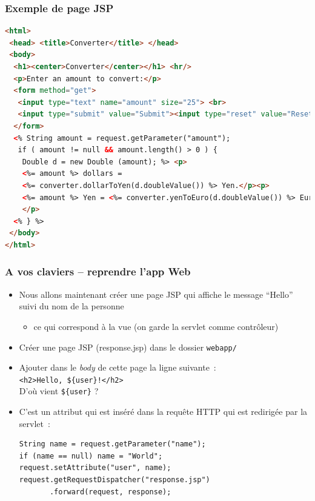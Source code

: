 \documentclass{beamer}
\begin{document}
\begin{frame}[fragile]
	\frametitle{Exemple de page JSP}
	\begin{flushleft}
\begin{lstlisting}[language=HTML,basicstyle=\tiny]
<html>
 <head> <title>Converter</title> </head>
 <body>
  <h1><center>Converter</center></h1> <hr/>
  <p>Enter an amount to convert:</p>
  <form method="get">
   <input type="text" name="amount" size="25"> <br>
   <input type="submit" value="Submit"><input type="reset" value="Reset">
  </form>
  <% String amount = request.getParameter("amount");
   if ( amount != null && amount.length() > 0 ) {
    Double d = new Double (amount); %> <p>
    <%= amount %> dollars =
    <%= converter.dollarToYen(d.doubleValue()) %> Yen.</p><p>
    <%= amount %> Yen = <%= converter.yenToEuro(d.doubleValue()) %> Euro.
    </p>
  <% } %>
 </body>
</html>
\end{lstlisting}
	\end{flushleft}  
\end{frame}

\begin{frame}[fragile]
	\frametitle{A vos claviers -- reprendre l'app Web}
	\begin{itemize}
		\item Nous allons maintenant créer une page JSP qui affiche le message ``Hello'' suivi du nom de la personne
		\begin{itemize}
			\item ce qui correspond à la vue (on garde la servlet comme contrôleur)
		\end{itemize}
		\item Créer une page JSP (response.jsp) dans le dossier \texttt{webapp/}
		\item Ajouter dans le \textit{body} de cette page la ligne suivante~:\\
		\texttt{<h2>Hello, \$\{user\}!</h2>}\\
		D'où vient \texttt{\$\{user\}} ?
		\item C'est un attribut qui est inséré dans la requête HTTP qui est redirigée par la servlet~:
\begin{lstlisting}
String name = request.getParameter("name");
if (name == null) name = "World";
request.setAttribute("user", name);
request.getRequestDispatcher("response.jsp")
       .forward(request, response);	
\end{lstlisting}
	\end{itemize}
\end{frame}
\end{document}
